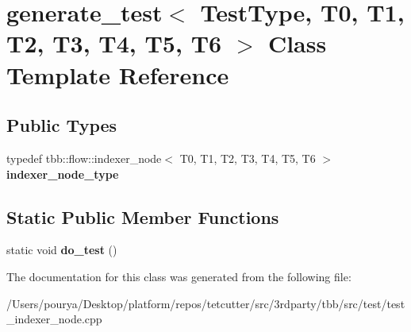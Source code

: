 \hypertarget{classgenerate__test_3_01TestType_00_01T0_00_01T1_00_01T2_00_01T3_00_01T4_00_01T5_00_01T6_01_4}{}\section{generate\+\_\+test$<$ Test\+Type, T0, T1, T2, T3, T4, T5, T6 $>$ Class Template Reference}
\label{classgenerate__test_3_01TestType_00_01T0_00_01T1_00_01T2_00_01T3_00_01T4_00_01T5_00_01T6_01_4}
\subsection*{Public Types}
\begin{DoxyCompactItemize}
\item 
\hypertarget{classgenerate__test_3_01TestType_00_01T0_00_01T1_00_01T2_00_01T3_00_01T4_00_01T5_00_01T6_01_4_a508e17ef089230f8bd0ddd98ab5bb4cb}{}typedef tbb\+::flow\+::indexer\+\_\+node$<$ T0, T1, T2, T3, T4, T5, T6 $>$ {\bfseries indexer\+\_\+node\+\_\+type}\label{classgenerate__test_3_01TestType_00_01T0_00_01T1_00_01T2_00_01T3_00_01T4_00_01T5_00_01T6_01_4_a508e17ef089230f8bd0ddd98ab5bb4cb}

\end{DoxyCompactItemize}
\subsection*{Static Public Member Functions}
\begin{DoxyCompactItemize}
\item 
\hypertarget{classgenerate__test_3_01TestType_00_01T0_00_01T1_00_01T2_00_01T3_00_01T4_00_01T5_00_01T6_01_4_a6f8152d82ffdd1ba00e9b53f567532d9}{}static void {\bfseries do\+\_\+test} ()\label{classgenerate__test_3_01TestType_00_01T0_00_01T1_00_01T2_00_01T3_00_01T4_00_01T5_00_01T6_01_4_a6f8152d82ffdd1ba00e9b53f567532d9}

\end{DoxyCompactItemize}


The documentation for this class was generated from the following file\+:\begin{DoxyCompactItemize}
\item 
/\+Users/pourya/\+Desktop/platform/repos/tetcutter/src/3rdparty/tbb/src/test/test\+\_\+indexer\+\_\+node.\+cpp\end{DoxyCompactItemize}
